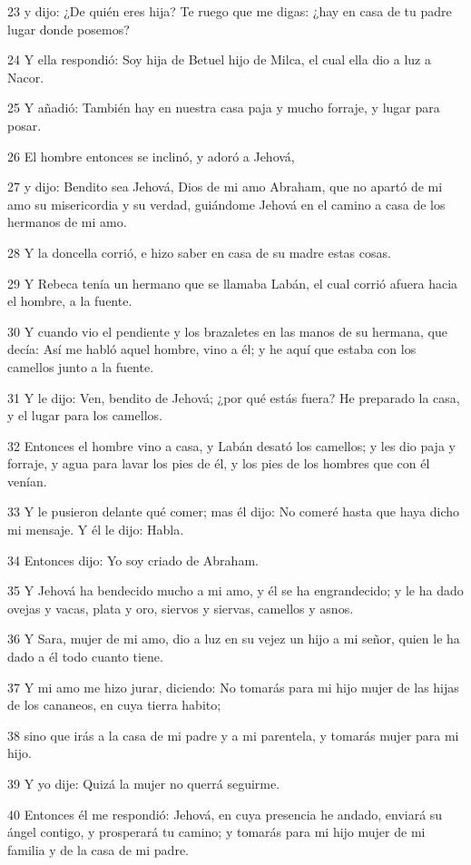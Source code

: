 23 y dijo: ¿De quién eres hija? Te ruego que me digas: ¿hay en casa de tu padre lugar donde posemos?

24 Y ella respondió: Soy hija de Betuel hijo de Milca, el cual ella dio a luz a Nacor.

25 Y añadió: También hay en nuestra casa paja y mucho forraje, y lugar para posar.

26 El hombre entonces se inclinó, y adoró a Jehová,

27 y dijo: Bendito sea Jehová, Dios de mi amo Abraham, que no apartó de mi amo su misericordia y su verdad, guiándome Jehová en el camino a casa de los hermanos de mi amo.

28 Y la doncella corrió, e hizo saber en casa de su madre estas cosas.

29 Y Rebeca tenía un hermano que se llamaba Labán, el cual corrió afuera hacia el hombre, a la fuente.

30 Y cuando vio el pendiente y los brazaletes en las manos de su hermana, que decía: Así me habló aquel hombre, vino a él; y he aquí que estaba con los camellos junto a la fuente.

31 Y le dijo: Ven, bendito de Jehová; ¿por qué estás fuera? He preparado la casa, y el lugar para los camellos.

32 Entonces el hombre vino a casa, y Labán desató los camellos; y les dio paja y forraje, y agua para lavar los pies de él, y los pies de los hombres que con él venían.

33 Y le pusieron delante qué comer; mas él dijo: No comeré hasta que haya dicho mi mensaje. Y él le dijo: Habla.

34 Entonces dijo: Yo soy criado de Abraham.

35 Y Jehová ha bendecido mucho a mi amo, y él se ha engrandecido; y le ha dado ovejas y vacas, plata y oro, siervos y siervas, camellos y asnos.

36 Y Sara, mujer de mi amo, dio a luz en su vejez un hijo a mi señor, quien le ha dado a él todo cuanto tiene.

37 Y mi amo me hizo jurar, diciendo: No tomarás para mi hijo mujer de las hijas de los cananeos, en cuya tierra habito;

38 sino que irás a la casa de mi padre y a mi parentela, y tomarás mujer para mi hijo.

39 Y yo dije: Quizá la mujer no querrá seguirme.

40 Entonces él me respondió: Jehová, en cuya presencia he andado, enviará su ángel contigo, y prosperará tu camino; y tomarás para mi hijo mujer de mi familia y de la casa de mi padre.

